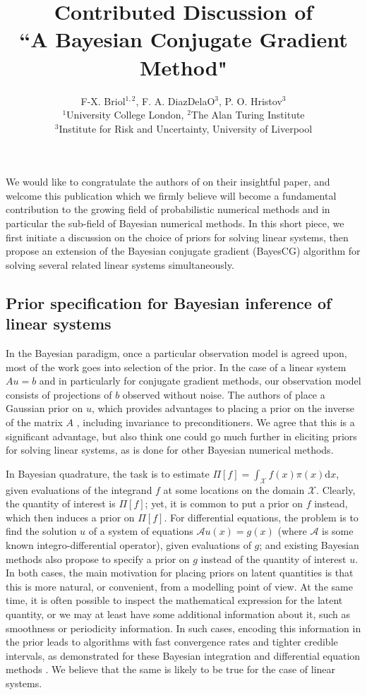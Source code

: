 \documentclass[twoside]{article}
\title{Contributed Discussion of \\``A Bayesian Conjugate Gradient Method"}
\author{F-X. Briol$^{1,2}$, F. A. DiazDelaO$^{3}$, P. O. Hristov$^{3}$\\ $^{1}$University College London, $^{2}$The Alan Turing Institute \\ $^{3}$Institute for Risk and Uncertainty, University of Liverpool}
\begin{document}
\maketitle
		We would like to congratulate the authors of \cite{Cockayne2019} on their insightful paper, and welcome this publication which we firmly believe will become a fundamental contribution to the growing field of probabilistic numerical methods and in particular the sub-field of Bayesian numerical methods. In this short piece, we first initiate a discussion on the choice of priors for solving linear systems, then propose an extension of the Bayesian conjugate gradient (BayesCG) algorithm for solving several related linear systems simultaneously.
		
	\subsection*{Prior specification for Bayesian inference of linear systems}

		In the Bayesian paradigm, once a particular observation model is agreed upon, most of the work goes into selection of the prior. In the case of a linear system $A u = b$ and in particularly for conjugate gradient methods, our observation model consists of projections of $b$ observed without noise. The authors of \cite{Cockayne2019} place a Gaussian prior on $u$, which provides advantages to placing a prior on the inverse of the matrix $A$ \cite{Hen15}, including invariance to preconditioners. We agree that this is a significant advantage, but also think one could go much further in eliciting priors for solving linear systems, as is done for other Bayesian numerical methods. 

		In Bayesian quadrature, the task is to estimate $\Pi[f] = \int_{\mathcal{X}} f(x) \pi(x) \mathrm{d}x$, given evaluations of the integrand $f$ at some locations on the domain $\mathcal{X}$. Clearly, the quantity of interest is 
		$\Pi[f]$; yet, it is common to put a prior on $f$ instead, which then induces a prior on $\Pi[f]$. For differential equations, the problem is to find the solution $u$ of a system of equations $\mathcal{A} u(x) =g(x)$ (where $\mathcal{A}$ is some known integro-differential operator), given evaluations of $g$; and existing Bayesian methods also propose to specify a prior on $g$ instead of the quantity of interest $u$.
		In both cases, the main motivation for placing priors on latent quantities is that this is more natural, or convenient, from a modelling point of view. At the same time, it is often possible to inspect the mathematical expression for the latent quantity, or we may at least have some additional information about it, such as smoothness or periodicity information. In such cases, encoding this information in the prior leads to algorithms with fast convergence rates and tighter credible intervals, as demonstrated for these Bayesian integration and differential equation methods \cite{Cockayne2016,Briol2019PI}. We believe that the same is likely to be true for the case of linear systems.
		
\end{document}
